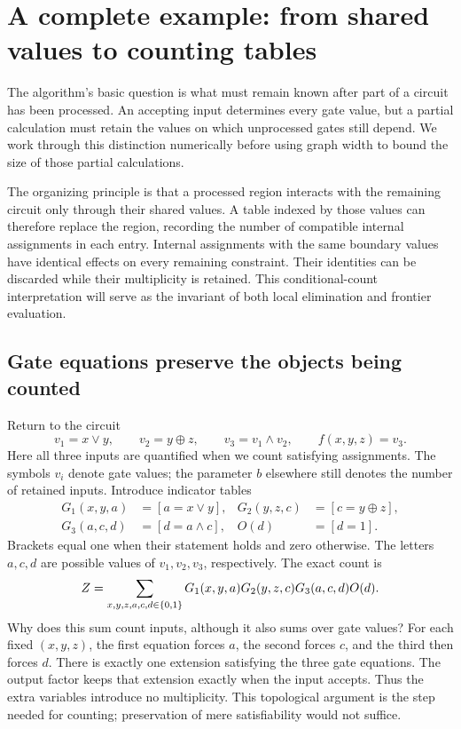 \section{A complete example: from shared values to counting tables}
\label{sec:counting-walkthrough}

The algorithm's basic question is what must remain known after part of a
circuit has been processed. An accepting input determines every gate value,
but a partial calculation must retain the values on which unprocessed gates
still depend. We work through this distinction numerically before using
graph width to bound the size of those partial calculations.

The organizing principle is that a processed region interacts with the
remaining circuit only through their shared values. A table indexed by
those values can therefore replace the region, recording the number of
compatible internal assignments in each entry. Internal assignments with
the same boundary values have identical effects on every remaining
constraint. Their identities can be discarded while their multiplicity
is retained. This conditional-count interpretation will serve as the
invariant of both local elimination and frontier evaluation.

\subsection{Gate equations preserve the objects being counted}

Return to the circuit
\[
 v_1=x\lor y,\qquad v_2=y\oplus z,\qquad
 v_3=v_1\land v_2,\qquad f(x,y,z)=v_3.
\]
Here all three inputs are quantified when we count satisfying assignments.
The symbols $v_i$ denote gate values; the parameter $b$ elsewhere still
denotes the number of retained inputs. Introduce indicator tables
\[
 \begin{aligned}
 G_1(x,y,a)&=[a=x\lor y],&
 G_2(y,z,c)&=[c=y\oplus z],\\
 G_3(a,c,d)&=[d=a\land c],& O(d)&=[d=1].
 \end{aligned}
\]
Brackets equal one when their statement holds and zero otherwise. The
letters $a,c,d$ are possible values of $v_1,v_2,v_3$, respectively.
The exact count is
\begin{equation}\label{eq:walk-count}
 Z=\sum_{x,y,z,a,c,d\in\{0,1\}}
 G_1(x,y,a)G_2(y,z,c)G_3(a,c,d)O(d).
\end{equation}
Why does this sum count inputs, although it also sums over gate values?
For each fixed $(x,y,z)$, the first equation forces $a$, the second forces
$c$, and the third then forces $d$. There is exactly one extension satisfying
the three gate equations. The output factor keeps that extension exactly
when the input accepts. Thus the extra variables introduce no multiplicity.
This topological argument is the step needed for counting; preservation of
mere satisfiability would not suffice.


